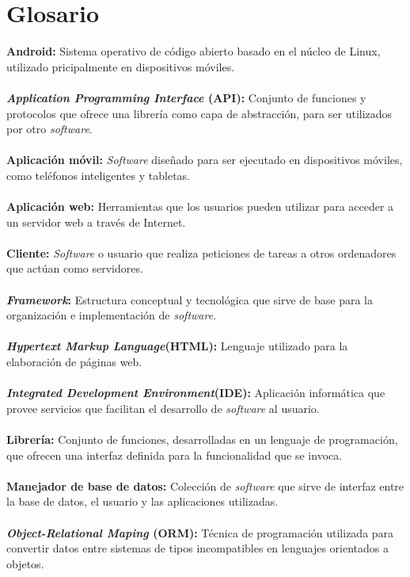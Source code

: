 \chapter*{Glosario}
\noindent
\textbf{Android:} Sistema operativo de código abierto basado en el núcleo de Linux, utilizado pricipalmente en dispositivos móviles.\\ 	\\
\textbf{\textit{Application Programming Interface} (API):} Conjunto de funciones y protocolos que ofrece una librería como capa de abstracción, para ser utilizados por otro \textit{software}.\\ \\
\textbf{Aplicación móvil:} \textit{Software} diseñado para ser ejecutado en dispositivos móviles, como teléfonos inteligentes y tabletas.\\ \\
\textbf{Aplicación web:} Herramientas que los usuarios pueden utilizar para acceder a un servidor web a través de Internet.\\ \\
\textbf{Cliente:} \textit{Software} o usuario que realiza peticiones de tareas a otros ordenadores que actúan como servidores.\\ \\
\textbf{\textit{Framework}:} Estructura conceptual y tecnológica que sirve de base para la organización e implementación de \textit{software}.\\ \\
\textbf{\textit{Hypertext Markup Language}(HTML):} Lenguaje utilizado para la elaboración de páginas web.\\ \\
\textbf{\textit{Integrated Development Environment}(IDE):} Aplicación informática que provee servicios que facilitan el desarrollo de \textit{software} al usuario.\\ \\
\textbf{Librería:} Conjunto de funciones, desarrolladas en un lenguaje de programación, que ofrecen una interfaz definida para la funcionalidad que se invoca.\\ \\
\textbf{Manejador de base de datos:} Colección de \textit{software} que sirve de interfaz entre la base de datos, el usuario y las aplicaciones utilizadas.\\ \\
\textbf{\textit{Object-Relational Maping} (ORM):} Técnica de programación utilizada para convertir datos entre sistemas de tipos incompatibles en lenguajes orientados a objetos.\\ \\
